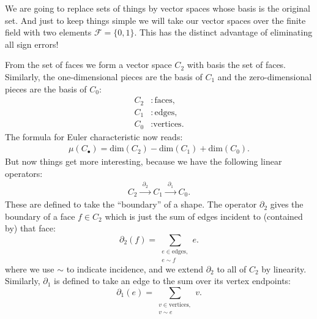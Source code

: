 \documentclass[11pt,oneside]{report}
\newcommand{\Field}{\mathcal{F}}
\def\euler{\mu}
\begin{document}
We are going to replace sets of things by vector
spaces whose basis is the original set.
And just to keep things simple we will 
take our vector spaces over the finite field with
two elements $\Field=\{0, 1\}.$
This has the distinct advantage
of eliminating all sign errors!

From the set of faces we form a vector space
$C_2$ with basis the set of faces.
Similarly, the one-dimensional pieces are the basis of $C_1$
and the zero-dimensional pieces are the basis of $C_0$:
\begin{align*}
    C_2 &: \mbox{faces},\\
    C_1 &: \mbox{edges},\\
    C_0 &: \mbox{vertices.}
\end{align*}
The formula for Euler characteristic now reads:
\begin{align}\label{EulerEq}
    \euler(C_{\bullet}) = \mbox{dim}(C_2) - \mbox{dim}(C_1) + \mbox{dim}(C_0).
\end{align}
But now things get more interesting,
because we have the following linear operators:
\begin{align}\label{Sequence}
    C_2 \xrightarrow{\ \ \partial_2\ \ } C_1 \xrightarrow{\ \ \partial_1\ \ } C_0.
\end{align}
These are defined to take the ``boundary'' of a shape. 
The operator $\partial_2$ gives the boundary of a face $f\in C_2$
which is just the sum of edges incident to (contained by) that face:
$$
    \partial_2(f) = \sum_{\substack{e\in \text{edges},\\e\sim f}} e.
$$
where we use $\sim$ to indicate incidence, and we extend
$\partial_2$ to all of $C_2$ by linearity.
Similarly, $\partial_1$ is defined to take an edge
to the sum over its vertex endpoints:
$$
    \partial_1(e) = \sum_{\substack{v\in \text{vertices},\\v\sim e}} v.
$$
\end{document}
